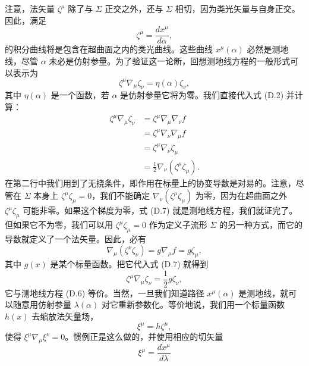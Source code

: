 注意，法矢量 $\zeta^\mu$ 除了与 $\Sigma$ 正交之外，还与 $\Sigma$ 相切，因为类光矢量与自身正交。因此，满足
\begin{equation*}
\zeta^\mu = \frac{d x^\mu}{d\alpha},
\tag{D.5}
\end{equation*}
的积分曲线将是包含在超曲面之内的类光曲线。这些曲线 $x^\mu(\alpha)$ 必然是测地线，尽管 $\alpha$ 未必是仿射参量。为了验证这一论断，回想测地线方程的一般形式可以表示为
\begin{equation*}
\zeta^\mu \nabla_\mu \zeta_\nu = \eta(\alpha) \zeta_\nu,
\tag{D.6}
\end{equation*}
其中 $\eta(\alpha)$ 是一个函数，若 $\alpha$ 是仿射参量它将为零。我们直接代入式 (D.2) 并计算：
\begin{align*}
\zeta^\mu \nabla_\mu \zeta_\nu &= \zeta^\mu \nabla_\mu \nabla_\nu f \\
&= \zeta^\mu \nabla_\nu \nabla_\mu f \\
&= \zeta^\mu \nabla_\nu \zeta_\mu \\
&= \frac{1}{2} \nabla_\nu (\zeta^\mu \zeta_\mu).
\tag{D.7}
\end{align*}
在第二行中我们用到了无挠条件，即作用在标量上的协变导数是对易的。注意，尽管在 $\Sigma$ 本身上 $\zeta^\mu \zeta_\mu = 0$，我们不能确定 $\nabla_\nu (\zeta^\mu \zeta_\mu)$ 为零，因为在超曲面之外 $\zeta^\mu \zeta_\mu$ 可能非零。如果这个梯度为零，式 (D.7) 就是测地线方程，我们就证完了。但如果它不为零，我们可以用 $\zeta^\mu \zeta_\mu = 0$ 作为定义子流形 $\Sigma$ 的另一种方式，而它的导数就定义了一个法矢量。因此，必有
\begin{equation*}
\nabla_\mu (\zeta^\nu \zeta_\nu) = g \nabla_\mu f = g \zeta_\mu,
\tag{D.8}
\end{equation*}
其中 $g(x)$ 是某个标量函数。把它代入式 (D.7) 就得到
\begin{equation*}
\zeta^\mu \nabla_\mu \zeta_\nu = \frac{1}{2} g \zeta_\nu,
\tag{D.9}
\end{equation*}
它与测地线方程 (D.6) 等价。当然，一旦我们知道路径 $x^\mu(\alpha)$ 是测地线，就可以随意用仿射参量 $\lambda(\alpha)$ 对它重新参数化。等价地说，我们用一个标量函数 $h(x)$ 去缩放法矢量场，
\begin{equation*}
\xi^\mu = h \zeta^\mu,
\tag{D.10}
\end{equation*}
使得 $\xi^\mu \nabla_\mu \xi^\nu = 0$。惯例正是这么做的，并使用相应的切矢量
\begin{equation*}
\xi^\mu = \frac{d x^\mu}{d\lambda}
\tag{D.11}
\end{equation*}

